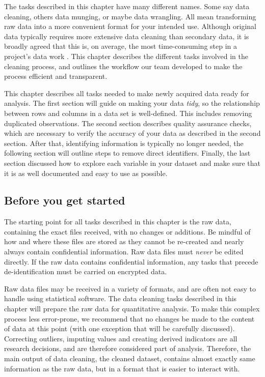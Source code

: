 
\begin{fullwidth}

The tasks described in this chapter have many different names.
Some say data cleaning, others data munging, or maybe data wrangling.
All mean transforming raw data into a more convenient format for your intended use.
Although original data typically requires more extensive data cleaning than secondary data,
it is broadly agreed that this is, on average, the most time-consuming step in a project's data work \citep{dasu2003exploratory}.
This chapter describes the different tasks involved in the cleaning process,
and outlines the workflow our team developed to make the process efficient and transparent.

This chapter describes all tasks needed to make newly acquired data ready for analysis.
The first section will guide on making your data \textit{tidy},
so the relationship between rows and columns in a data set is well-defined.
This includes removing duplicated observations.
The second section describes quality assurance checks, which are necessary to verify the accuracy of your data
as described in the second section.
After that, identifying information is typically no longer needed,
the following section will outline steps to remove direct identifiers.
Finally, the last section discussed how to explore each variable in your dataset and 
make sure that it is as well documented and easy to use as possible.


\end{fullwidth}


\subsection{Before you get started}

The starting point for all tasks described in this chapter is the raw data,
containing the exact files received, with no changes or additions.
Be mindful of how and where these files are stored
as they cannot be re-created and nearly always contain confidential information.
Raw data files must \textit{never} be edited directly.
If the raw data contains confidential information,
any tasks that precede de-identification must be carried on encrypted data.
 
Raw data files may be received in a variety of formats, 
and are often not easy to handle using statistical software.
The data cleaning tasks described in this chapter will prepare the raw data
for quantitative analysis.
To make this complex process less error-prone,
we recommend that no changes be made to the content of data at this point
(with one exception that will be carefully discussed).
Correcting outliers, imputing values and creating derived indicators
are all research decisions, and are therefore considered part of analysis.
Therefore, the main output of data cleaning, the cleaned dataset,
contains almost exactly same information as the raw data,
but in a format that is easier to interact with.  

